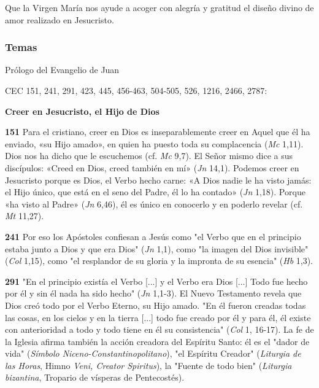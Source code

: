 \documentclass[]{article}
\begin{document}
Que la Virgen María nos ayude a acoger con alegría y gratitud el diseño
divino de amor realizado en
Jesucristo.\protect\hypertarget{_Ref448598876}{}{\protect\hypertarget{_Toc448662858}{}{\protect\hypertarget{_Toc448690377}{}{}}}



\subsubsection{Temas}\label{temas-10}

Prólogo del Evangelio de Juan

CEC 151, 241, 291, 423, 445, 456-463, 504-505, 526, 1216, 2466, 2787:

\textbf{Creer en Jesucristo, el Hijo de Dios}

\textbf{151} Para el cristiano, creer en Dios es inseparablemente creer
en Aquel que él ha enviado, «su Hijo amado», en quien ha puesto toda su
complacencia (\emph{Mc} 1,11). Dios nos ha dicho que le escuchemos (cf.
\emph{Mc} 9,7). El Señor mismo dice a sus discípulos: «Creed en Dios,
creed también en mí» (\emph{Jn} 14,1). Podemos creer en Jesucristo
porque es Dios, el Verbo hecho carne: «A Dios nadie le ha visto jamás:
el Hijo único, que está en el seno del Padre, él lo ha contado»
(\emph{Jn} 1,18). Porque «ha visto al Padre» (\emph{Jn} 6,46), él es
único en conocerlo y en poderlo revelar (cf. \emph{Mt} 11,27).

\textbf{241} Por eso los Apóstoles confiesan a Jesús como "el Verbo que
en el principio estaba junto a Dios y que era Dios" (\emph{Jn} 1,1),
como "la imagen del Dios invisible" (\emph{Col} 1,15), como "el
resplandor de su gloria y la impronta de su esencia" (\emph{Hb} 1,3).

\textbf{291} "En el principio existía el Verbo {[}...{]} y el Verbo era
Dios {[}...{]} Todo fue hecho por él y sin él nada ha sido hecho"
(\emph{Jn} 1,1-3). El Nuevo Testamento revela que Dios creó todo por el
Verbo Eterno, su Hijo amado. "En él fueron creadas todas las cosas, en
los cielos y en la tierra {[}...{]} todo fue creado por él y para él, él
existe con anterioridad a todo y todo tiene en él su consistencia"
(\emph{Col} 1, 16-17). La fe de la Iglesia afirma también la acción
creadora del Espíritu Santo: él es el "dador de vida" (\emph{Símbolo
Niceno-Constantinopolitano}), "el Espíritu Creador" (\emph{Liturgia de
las Horas}, Himno \emph{Veni, Creator Spiritus}), la "Fuente de todo
bien" (\emph{Liturgia bizantina}, Tropario de vísperas de Pentecostés).
\end{document}
